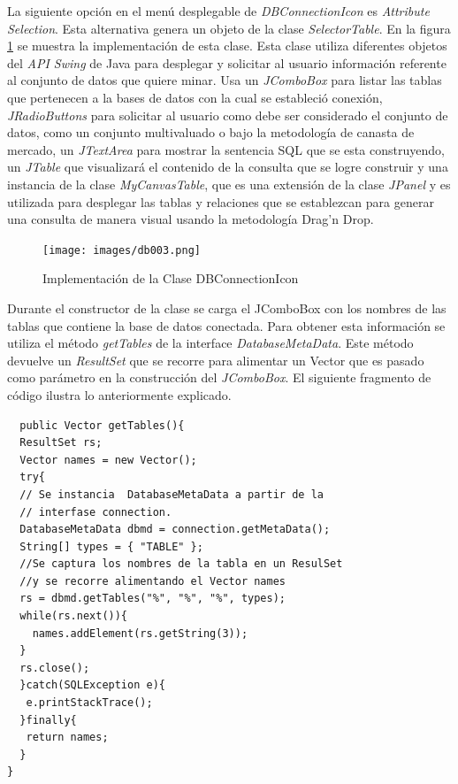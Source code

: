 La siguiente opci\'on en el men\'u desplegable de \textit{DBConnectionIcon} es \textit{Attribute Selection}. 
Esta alternativa genera un objeto de la clase \textit{SelectorTable}.  En la figura \ref{db003} se muestra la
implementaci\'on de esta clase.  Esta clase utiliza diferentes objetos del \textit{API Swing} de Java para
desplegar y solicitar al usuario informaci\'on referente al conjunto de datos que quiere minar.  Usa un 
\textit{JComboBox} para listar las tablas que pertenecen a la bases de datos con la cual se estableci\'o conexi\'on, \textit{JRadioButtons} para solicitar al usuario como debe ser considerado el conjunto de datos, como 
un conjunto multivaluado o bajo la metodolog\'ia de canasta de mercado, un \textit{JTextArea} para mostrar la 
sentencia SQL que se esta construyendo, un \textit{JTable} que visualizar\'a el contenido de la consulta que se
logre construir y una instancia de la clase \textit{MyCanvasTable}, que es una extensi\'on de la clase
\textit{JPanel} y es utilizada para desplegar las tablas y relaciones que se establezcan para generar una
consulta de manera visual usando la metodolog\'ia Drag'n Drop.\\

\begin{figure}[ht]
\centering
\texttt{[image: images/db003.png]}
\caption{Implementaci\'on de la Clase DBConnectionIcon}
\label{db003}
\end{figure}

Durante el constructor de la clase se carga el JComboBox con los nombres de las tablas que contiene la base de
datos conectada.  Para obtener esta informaci\'on se utiliza el m\'etodo \textit{getTables} de la interface
\textit{DatabaseMetaData}.  Este m\'etodo devuelve un \textit{ResultSet} que se recorre para alimentar un Vector
que es pasado como par\'ametro en la construcci\'on del \textit{JComboBox}.  El siguiente fragmento de c\'odigo
ilustra lo anteriormente explicado.\\

\begin{codigof}
\fontsize{11}{3}
\begin{verbatim}
  public Vector getTables(){
  ResultSet rs;
  Vector names = new Vector();
  try{
  // Se instancia  DatabaseMetaData a partir de la
  // interfase connection.
  DatabaseMetaData dbmd = connection.getMetaData();
  String[] types = { "TABLE" };
  //Se captura los nombres de la tabla en un ResulSet
  //y se recorre alimentando el Vector names
  rs = dbmd.getTables("%", "%", "%", types);
  while(rs.next()){
    names.addElement(rs.getString(3));
  }
  rs.close();
  }catch(SQLException e){
   e.printStackTrace();
  }finally{
   return names;
  }
}
\end{verbatim}
\caption{Funci\'on \textit{getTables}}
\end{codigof}

